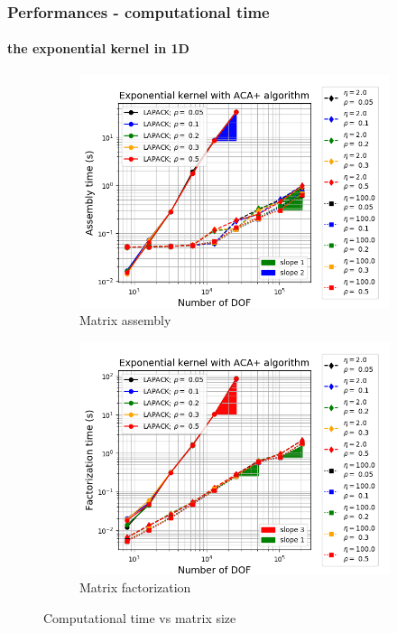 \begin{frame}
\frametitle{Performances - computational time}
\framesubtitle{the exponential kernel in 1D}
\begin{figure}
    \centering
    \begin{subfigure}[b]{0.45\textwidth}
        \includegraphics[scale=0.3]{./img/line_EXP_assembly_time}
        \caption{Matrix assembly}
    \end{subfigure}
    \begin{subfigure}[b]{0.45\textwidth}
        \includegraphics[scale=0.3]{./img/line_EXP_factorization_time}
        \caption{Matrix factorization}
    \end{subfigure}
    \caption{Computational time vs matrix size}
\end{figure}
\end{frame}

